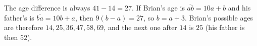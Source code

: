 The age difference is always $41-14=27$. If Brian's age is $\overline{ab}=10a+b$ and his father's is $\overline{ba}=10b+a$, then $9(b-a)=27$, so $b=a+3$. Brian's possible ages are therefore $14,25,36,47,58,69$, and the next one after $14$ is $\boxed{25}$ (his father is then $52$).
